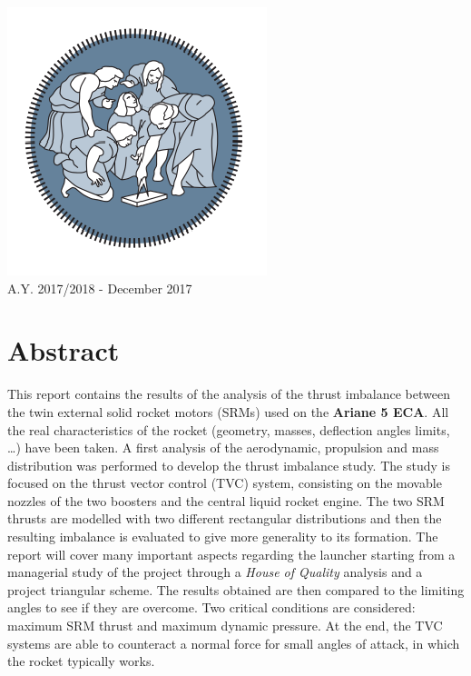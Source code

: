 \documentclass[12pt,fleqn,openany]{book} %
\begin{document}
\begin{titlepage}
\begin{center}
\includegraphics[scale=0.6]{Logo.png}\\[1.5cm] %
{\large A.Y. 2017/2018 - December 2017}\\[3cm] %
\vfill %
\end{center}
\end{titlepage}
\pagestyle{empty} %
\chapter*{Abstract}
This report contains the results of the analysis of the thrust imbalance between the twin external solid rocket motors (SRMs) used on the \textbf{Ariane 5 ECA}. All the real characteristics of the rocket (geometry, masses, deflection angles limits, …) have been taken. A first analysis of the aerodynamic, propulsion and mass distribution was performed to develop the thrust imbalance study. The study is focused on the thrust vector control (TVC) system, consisting on the movable nozzles of the two boosters and the central liquid rocket engine. The two SRM thrusts are modelled with two different rectangular distributions and then the resulting imbalance is evaluated to give more generality to its formation. The report will cover many important aspects regarding the launcher starting from a managerial study of the project through a \textit{House of Quality} analysis and a project triangular scheme. The results obtained are then compared to the limiting angles to see if they are overcome. Two critical conditions are considered: maximum SRM thrust and maximum dynamic pressure. At the end, the TVC systems are able to counteract a normal force for small angles of attack, in which the rocket typically works. \tableofcontents %
\end{document}
